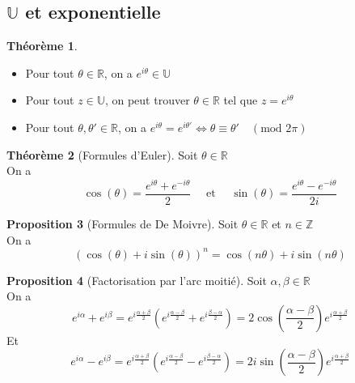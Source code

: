 \documentclass[10pt,a4paper]{article}
\theoremstyle{definition}
\newtheorem{proposition}{Proposition}[section]
\newtheorem{theorem}[proposition]{Théorème}
\begin{document}
\subsection{$\mathbb{U}$ et exponentielle}
\begin{theorem}
\hfill
\begin{itemize}
\item Pour tout $\theta \in \mathbb{R}$, on a $e^{i\theta} \in \mathbb{U}$
\item Pour tout $z \in \mathbb{U}$, on peut trouver $\theta \in \mathbb{R}$ tel que $z = e^{i\theta}$
\item Pour tout $\theta, \theta' \in \mathbb{R}$, on a $e^{i\theta} = e^{i\theta'} \iff \theta \equiv \theta' \quad (\text{mod }2\pi)$
\end{itemize}
\end{theorem}
\begin{theorem}[Formules d'Euler]
Soit $\theta \in \mathbb{R}$ \\
On a
\[ \cos(\theta) = \frac{e^{i\theta} + e^{-i\theta}}{2} \quad \text{ et } \quad \sin(\theta) = \frac{e^{i\theta} - e^{-i\theta}}{2i} \]
\end{theorem}
\begin{proposition}[Formules de De Moivre]
Soit $\theta \in \mathbb{R}$ et $n \in \mathbb{Z}$ \\
On a 
\[ (\cos(\theta) + i\sin(\theta))^n = \cos(n\theta) + i\sin(n\theta) \]
\end{proposition}
\begin{proposition}[Factorisation par l'arc moitié]
Soit $\alpha, \beta \in \mathbb{R}$ \\
On a
\[ e^{i\alpha} + e^{i\beta} = e^{i \frac{\alpha + \beta}{2}} \left( e^{i \frac{\alpha - \beta}{2}} + e^{i \frac{\beta - \alpha}{2}} \right) = 2\cos\left(\frac{\alpha - \beta}{2}\right) e^{i \frac{\alpha + \beta}{2}} \]
Et 
\[ e^{i\alpha} - e^{i\beta} = e^{i \frac{\alpha + \beta}{2}} \left( e^{i \frac{\alpha - \beta}{2}} - e^{i \frac{\beta - \alpha}{2}} \right) = 2i\sin\left(\frac{\alpha - \beta}{2}\right) e^{i \frac{\alpha + \beta}{2}} \]
\end{proposition}
\end{document}
